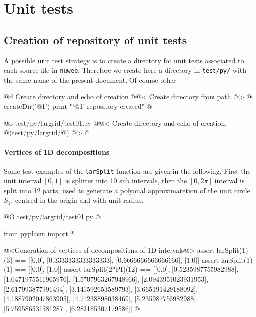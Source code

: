 \documentclass[11pt,oneside]{article}	%
\begin{document}
\section{Unit tests}
\label{sec:tests}

\subsection{Creation of repository of unit tests}

A possible unit test strategy is to create a directory for unit tests associated to each source file in \texttt{nuweb}. Therefore we create here a directory in \texttt{test/py/} with the same name of the present document. Of course other 

@d Create directory and echo of creation
@{@< Create directory from path @>
@%
createDir('@1')
print "'@1' repository created"
@}

@o test/py/largrid/test01.py
@{@< Create directory  and echo of creation: @(test/py/largrid/@) @>
@}


\paragraph{Vertices of 1D decompositions}
Some test examples of the \texttt{larSplit} function are given in the following. First the unit interval $[0,1]$ is splitter into 10 sub intervals, then the $[0,2\pi]$ interval is split into 12 parts, used to generate a polyonal approximatetion of the unit circle $S_1$, centred in the origin and with unit radius.

@O test/py/largrid/test01.py
@{from pyplasm import *

@<Generation of vertices of decompositions of 1D intervals@>
assert larSplit(1)(3) == [[0.0], [0.3333333333333333], [0.6666666666666666], [1.0]]
assert larSplit(1)(1) == [[0.0], [1.0]]
assert larSplit(2*PI)(12) == [[0.0], [0.5235987755982988], [1.0471975511965976], 
[1.5707963267948966], [2.0943951023931953], [2.617993877991494], 
[3.141592653589793], [3.665191429188092], [4.1887902047863905], 
[4.71238898038469], [5.235987755982988], [5.759586531581287], 
[6.283185307179586]]
@}
\end{document}
